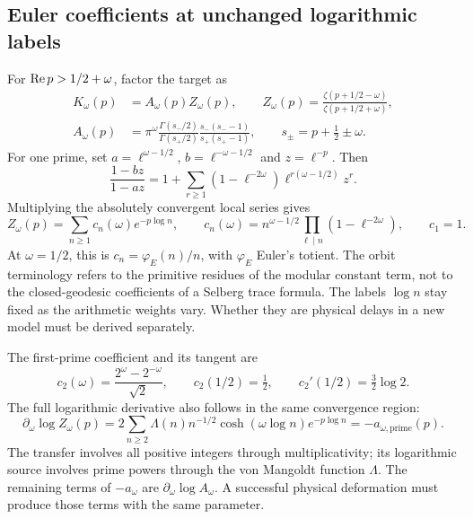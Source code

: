 \subsection{Euler coefficients at unchanged logarithmic labels}

For $\operatorname{Re} p>1/2+\omega$, factor the target as
\begin{align}
 K_\omega(p)&=A_\omega(p)Z_\omega(p),\qquad
 Z_\omega(p)=\frac{\zeta(p+1/2-\omega)}{\zeta(p+1/2+\omega)},
 \label{eq:factorization}\\
 A_\omega(p)&=\pi^\omega\frac{\Gamma(s_-/2)}{\Gamma(s_+/2)}
             \frac{s_-(s_--1)}{s_+(s_+-1)},\qquad
 s_\pm=p+\tfrac12\pm\omega.
 \label{eq:archimedean}
\end{align}
For one prime, set $a=\ell^{\omega-1/2}$,
$b=\ell^{-\omega-1/2}$ and $z=\ell^{-p}$. Then
\begin{equation}
 \frac{1-bz}{1-az}
 =1+\sum_{r\ge1}(1-\ell^{-2\omega})\ell^{r(\omega-1/2)}z^r.
\end{equation}
Multiplying the absolutely convergent local series gives
\begin{equation}
 Z_\omega(p)=\sum_{n\ge1}c_n(\omega)e^{-p\log n},\qquad
 c_n(\omega)=n^{\omega-1/2}\prod_{\ell\mid n}(1-\ell^{-2\omega}),
 \qquad c_1=1.
 \label{eq:coefficients}
\end{equation}
At $\omega=1/2$, this is $c_n=\varphi_E(n)/n$, with $\varphi_E$
Euler's totient. The orbit terminology refers to the primitive residues
of the modular constant term, not to the closed-geodesic coefficients
of a Selberg trace formula. The labels $\log n$ stay fixed as the
arithmetic weights vary. Whether they are physical delays in a new
model must be derived separately.

The first-prime coefficient and its tangent are
\begin{equation}
 c_2(\omega)=\frac{2^\omega-2^{-\omega}}{\sqrt2},\qquad
 c_2(1/2)=\tfrac12,\qquad c_2'(1/2)=\tfrac32\log2.
 \label{eq:first_prime}
\end{equation}
The full logarithmic derivative also follows in the same convergence
region:
\begin{equation}
 \partial_\omega\log Z_\omega(p)
 =2\sum_{n\ge2}\Lambda(n)n^{-1/2}\cosh(\omega\log n)e^{-p\log n}
 =-a_{\omega,\mathrm{prime}}(p).
 \label{eq:prime_generator}
\end{equation}
The transfer involves all positive integers through multiplicativity;
its logarithmic source involves prime powers through the von Mangoldt
function $\Lambda$. The remaining terms of $-a_\omega$ are
$\partial_\omega\log A_\omega$. A successful physical deformation must
produce those terms with the same parameter.
